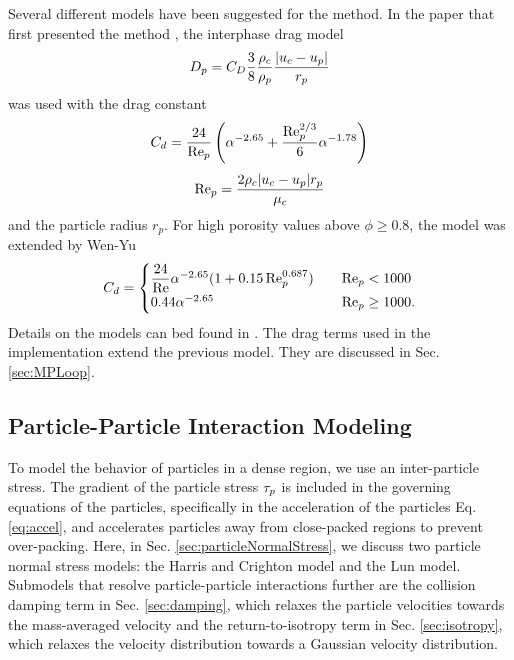 Several different models have been suggested for the \MP method. 
In the paper that first presented the method \cite{MPPICFirst}, the interphase drag model
\begin{align*}
    D_p = C_D\dfrac{3}{8} \dfrac{\rho_c}{\rho_p} \dfrac{\lvert u_c - u_p \rvert}{r_p}
\end{align*}
was used with the drag constant
\begin{align*}
    C_d = \dfrac{24}{\operatorname{Re}_p} \left( \alpha^{-2.65}+ \dfrac{\operatorname{Re}_p^{2/3}}{6} \alpha^{-1.78} \right)
\end{align*}
\begin{align*}
\operatorname{Re}_p = \dfrac{2 \rho_c \lvert u_c - u_p \rvert r_p}{\mu_c}
\end{align*}
and the particle radius $r_p$.
For high porosity values above $\phi \geq 0.8$, the model was extended by Wen-Yu \cite{WenYu}
\begin{align*}
    C_d =
    \begin{cases}
        \dfrac{24}{\operatorname{Re}} \alpha^{-2.65} (1+0.15 \operatorname{Re}_p^{0.687}) \quad & \operatorname{Re}_p < 1000 \\
        0.44 \alpha^{-2.65} & \operatorname{Re}_p \geq 1000.
    \end{cases}
\end{align*}
Details on the models can bed found in \cite{ErgunWenYu}. The drag terms used in the \OF implementation extend the previous model. They are discussed in Sec. \ref{sec:MPLoop}.

\subsection{Particle-Particle Interaction Modeling}
To model the behavior of particles in a dense region, we use an inter-particle stress.
The gradient of the particle stress $\tau_p$ is included in the governing equations of the particles, specifically in the acceleration of the particles Eq. \ref{eq:accel}, and accelerates particles away from close-packed regions to prevent over-packing.
Here, in Sec. \ref{sec:particleNormalStress}, we discuss two particle normal stress models: the Harris and Crighton model and the Lun model.
Submodels that resolve particle-particle interactions further are the collision damping term in Sec. \ref{sec:damping}, which relaxes the particle velocities towards the mass-averaged velocity
and the return-to-isotropy term in Sec. \ref{sec:isotropy}, which relaxes the velocity distribution towards a Gaussian velocity distribution.


